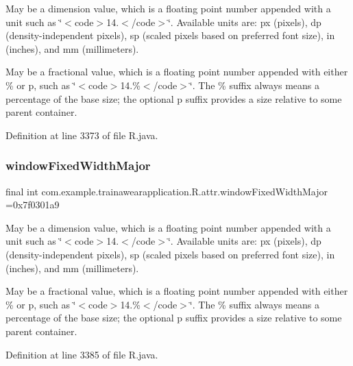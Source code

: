 May be a dimension value, which is a floating point number appended with a unit such as \char`\"{}$<$code$>$14.\+5sp$<$/code$>$\char`\"{}. Available units are\+: px (pixels), dp (density-\/independent pixels), sp (scaled pixels based on preferred font size), in (inches), and mm (millimeters). 

May be a fractional value, which is a floating point number appended with either \% or p, such as \char`\"{}$<$code$>$14.\%$<$/code$>$\char`\"{}. The \% suffix always means a percentage of the base size; the optional p suffix provides a size relative to some parent container. 

Definition at line 3373 of file R.\+java.

\mbox{\label{classcom_1_1example_1_1trainawearapplication_1_1_r_1_1attr_a777f6600986b72208b0394fcd5eedc23}} 
\subsubsection{\texorpdfstring{windowFixedWidthMajor}{windowFixedWidthMajor}}
{\footnotesize\ttfamily final int com.\+example.\+trainawearapplication.\+R.\+attr.\+window\+Fixed\+Width\+Major =0x7f0301a9\hspace{0.3cm}{\ttfamily [static]}}

May be a dimension value, which is a floating point number appended with a unit such as \char`\"{}$<$code$>$14.\+5sp$<$/code$>$\char`\"{}. Available units are\+: px (pixels), dp (density-\/independent pixels), sp (scaled pixels based on preferred font size), in (inches), and mm (millimeters). 

May be a fractional value, which is a floating point number appended with either \% or p, such as \char`\"{}$<$code$>$14.\%$<$/code$>$\char`\"{}. The \% suffix always means a percentage of the base size; the optional p suffix provides a size relative to some parent container. 

Definition at line 3385 of file R.\+java.

\mbox{\label{classcom_1_1example_1_1trainawearapplication_1_1_r_1_1attr_a6c9982d085664f162825a9fe2f119c93}} 
